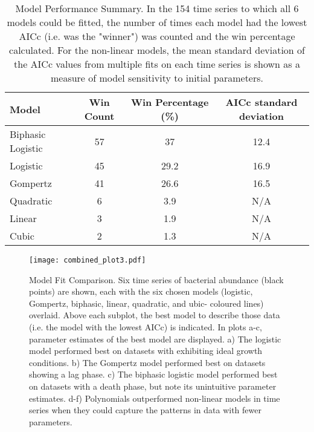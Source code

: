 \documentclass{article}
\begin{document}
\vspace{30pt}
\begin{table}[h!]
\centering
\caption{Model Performance Summary. In the 154 time series to which all 6 models could be fitted, the number of times each model had the lowest AICc (i.e. was the "winner") was counted and the win percentage calculated. For the non-linear models, the mean standard deviation of the AICc values from multiple fits on each time series is shown as a measure of model sensitivity to initial parameters.}
\begin{tabular}{|l|c|c|c|}
\hline
\textbf{Model} & \textbf{Win Count} & \textbf{Win Percentage (\%)} & \textbf{AICc standard deviation} \\ \hline
Biphasic Logistic & 57 & 37 & 12.4 \\ \hline
Logistic & 45 & 29.2 & 16.9 \\ \hline
Gompertz & 41 & 26.6 & 16.5 \\ \hline
Quadratic & 6 & 3.9 & N/A \\ \hline
Linear & 3 & 1.9 & N/A \\ \hline
Cubic & 2 & 1.3 & N/A \\ \hline
\end{tabular}

\label{tab:model_performance_win_AICc}
\end{table}


\begin{figure}
    \vspace{-2cm}
    \centering
    \texttt{[image: combined\_plot3.pdf]}
    \caption{Model Fit Comparison. Six time series of bacterial abundance (black points) are shown, each with the six chosen models (logistic, Gompertz, biphasic, linear, quadratic, and ubic- coloured lines) overlaid. Above each subplot, the best model to describe those data (i.e. the model with the lowest AICc) is indicated. In plots a-c, parameter estimates of the best model are displayed. a) The logistic model performed best on datasets with exhibiting ideal growth conditions. b) The Gompertz model performed best on datasets showing a lag phase. c) The biphasic logistic model performed best on datasets with a death phase, but note its unintuitive parameter estimates. d-f) Polynomials outperformed non-linear models in time series when they could capture the patterns in data with fewer parameters. }
    \label{fig:enter-label}
\end{figure}

\newpage
\end{document}
